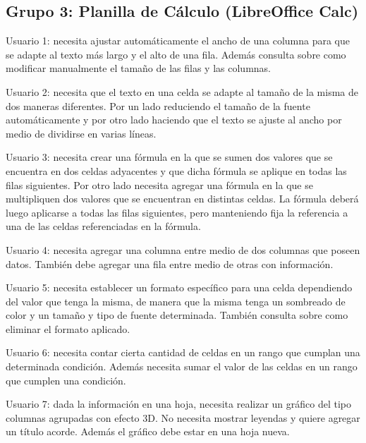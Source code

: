 \documentclass[12pt]{article}
\begin{document}
\subsection*{Grupo 3: Planilla de Cálculo (LibreOffice Calc)}

\begin{description}

    \item{Usuario 1}: necesita ajustar automáticamente el ancho de una columna
    para que se adapte al texto más largo y el alto de una fila. Además
    consulta sobre como modificar manualmente el tamaño de las filas y las
    columnas.

    \item{Usuario 2}: necesita que el texto en una celda se adapte al tamaño
    de la misma de dos maneras diferentes. Por un lado reduciendo el tamaño de
    la fuente automáticamente y por otro lado haciendo que el texto se ajuste
    al ancho por medio de dividirse en varias líneas.

    \item{Usuario 3}: necesita crear una fórmula en la que se sumen dos
    valores que se encuentra en dos celdas adyacentes y que dicha fórmula se
    aplique en todas las filas siguientes. Por otro lado necesita agregar una
    fórmula en la que se multipliquen dos valores que se encuentran en
    distintas celdas. La fórmula deberá luego aplicarse a todas las filas
    siguientes, pero manteniendo fija la referencia a una de las celdas
    referenciadas en la fórmula.

    \item{Usuario 4}: necesita agregar una columna entre medio de dos columnas
    que poseen datos. También debe agregar una fila entre medio de otras con
    información.

    \item{Usuario 5}: necesita establecer un formato específico para una celda
    dependiendo del valor que tenga la misma, de manera que la misma tenga un
    sombreado de color y un tamaño y tipo de fuente determinada. También
    consulta sobre como eliminar el formato aplicado.

    \item{Usuario 6}: necesita contar cierta cantidad de celdas en un rango
    que cumplan una determinada condición. Además necesita sumar el valor de
    las celdas en un rango que cumplen una condición.

    \item{Usuario 7}: dada la información en una hoja, necesita realizar un
    gráfico del tipo columnas agrupadas con efecto 3D. No necesita mostrar
    leyendas y quiere agregar un título acorde. Además el gráfico debe estar
    en una hoja nueva.


\end{description}
\end{document}
